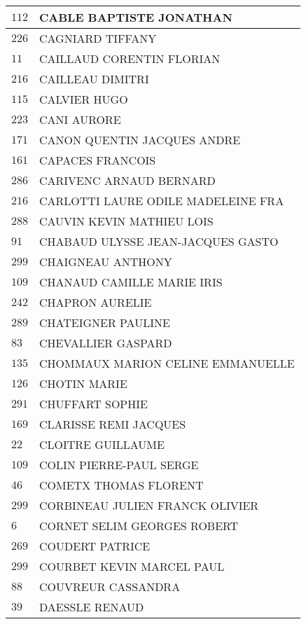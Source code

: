 \begin{xltabular}{\linewidth}{|l|X|}
    \hline
    $112$ & CABLE BAPTISTE JONATHAN \\
    \hline
    $226$ & CAGNIARD TIFFANY \\
    \hline
    $11$ & CAILLAUD CORENTIN FLORIAN \\
    \hline
    $216$ & CAILLEAU DIMITRI \\
    \hline
    $115$ & CALVIER HUGO \\
    \hline
    $223$ & CANI AURORE \\
    \hline
    $171$ & CANON QUENTIN JACQUES ANDRE \\
    \hline
    $161$ & CAPACES FRANCOIS \\
    \hline
    $286$ & CARIVENC ARNAUD BERNARD \\
    \hline
    $216$ & CARLOTTI LAURE ODILE MADELEINE FRA \\
    \hline
    $288$ & CAUVIN KEVIN MATHIEU LOIS \\
    \hline
    $91$ & CHABAUD ULYSSE JEAN-JACQUES GASTO \\
    \hline
    $299$ & CHAIGNEAU ANTHONY \\
    \hline
    $109$ & CHANAUD CAMILLE MARIE IRIS \\
    \hline
    $242$ & CHAPRON AURELIE \\
    \hline
    $289$ & CHATEIGNER PAULINE \\
    \hline
    $83$ & CHEVALLIER GASPARD \\
    \hline
    $135$ & CHOMMAUX MARION CELINE EMMANUELLE \\
    \hline
    $126$ & CHOTIN MARIE \\
    \hline
    $291$ & CHUFFART SOPHIE \\
    \hline
    $169$ & CLARISSE REMI JACQUES \\
    \hline
    $22$ & CLOITRE GUILLAUME \\
    \hline
    $109$ & COLIN PIERRE-PAUL SERGE \\
    \hline
    $46$ & COMETX THOMAS FLORENT \\
    \hline
    $299$ & CORBINEAU JULIEN FRANCK OLIVIER \\
    \hline
    $6$ & CORNET SELIM GEORGES ROBERT \\
    \hline
    $269$ & COUDERT PATRICE \\
    \hline
    $299$ & COURBET KEVIN MARCEL PAUL \\
    \hline
    $88$ & COUVREUR CASSANDRA \\
    \hline
    $39$ & DAESSLE RENAUD \\

\end{xltabular}
